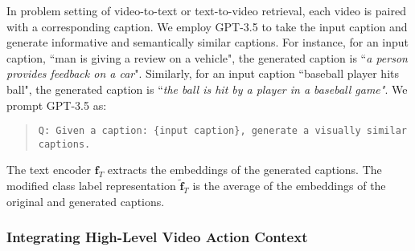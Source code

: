 \documentclass{article} \usepackage{iclr2024_conference,times}
\begin{document}
In problem setting of video-to-text or text-to-video retrieval, each video is paired with a corresponding caption. We employ GPT-3.5 to take the input caption and generate informative and semantically similar captions. For instance, for an input caption, ``man is giving a review on a vehicle", the generated caption is ``\emph{a person provides feedback on a car}". Similarly, for an input caption ``baseball player hits ball", the generated caption is ``\emph{the ball is hit by a player in a baseball game"}. We prompt GPT-3.5 as:
     \begin{quotation}
\centering \begin{minipage}{0.9\linewidth} {\texttt{Q: Given a caption: {\{input caption}\}, generate a visually similar captions.}} 


\end{minipage}
\end{quotation}

The text encoder $\bm{f}_{T}$ extracts the embeddings of the generated captions. The modified class label representation  $\bm{\tilde{f}}_T$ is the average of the embeddings of the original and generated captions.



\subsubsection{Integrating High-Level Video Action Context} 
\label{subsubsec: Integrating High-Level Video Action Context}
\end{document}
